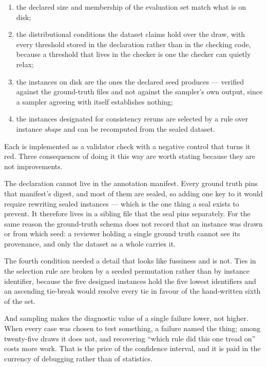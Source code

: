 \begin{enumerate}
  \item the declared size and membership of the evaluation set match what is on disk;
  \item the distributional conditions the dataset claims hold over the draw, with every
    threshold stored in the declaration rather than in the checking code, because a
    threshold that lives in the checker is one the checker can quietly relax;
  \item the instances on disk are the ones the declared seed produces --- verified against
    the ground-truth files and not against the sampler's own output, since a sampler agreeing
    with itself establishes nothing;
  \item the instances designated for consistency reruns are selected by a rule over instance
    \emph{shape} and can be recomputed from the sealed dataset.
\end{enumerate}

Each is implemented as a validator check with a negative control that turns it red. Three
consequences of doing it this way are worth stating because they are not improvements.

The declaration cannot live in the annotation manifest. Every ground truth pins that
manifest's digest, and most of them are sealed, so adding one key to it would require
rewriting sealed instances --- which is the one thing a seal exists to prevent. It therefore
lives in a sibling file that the seal pins separately. For the same reason the ground-truth
schema does not record that an instance was drawn or from which seed: a reviewer holding a
single ground truth cannot see its provenance, and only the dataset as a whole carries it.

The fourth condition needed a detail that looks like fussiness and is not. Ties in the
selection rule are broken by a seeded permutation rather than by instance identifier,
because the five designed instances hold the five lowest identifiers and an ascending
tie-break would resolve every tie in favour of the hand-written sixth of the set.

And sampling makes the diagnostic value of a single failure lower, not higher. When every
case was chosen to test something, a failure named the thing; among twenty-five draws it
does not, and recovering ``which rule did this one tread on'' costs more work. That is the
price of the confidence interval, and it is paid in the currency of debugging rather than of
statistics.

